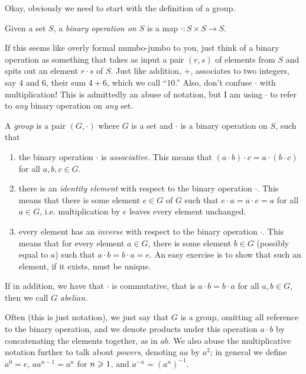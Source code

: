 \documentclass{article}
\begin{document}
Okay, obviously we need to start with the definition of a group.
\begin{definition}
Given a set $S$, a \emph{binary operation on $S$} is a map $\cdot:S\times S\to S$. 
\end{definition}
If this seems like overly formal mumbo-jumbo to you, just think of a binary operation as something that takes as input a pair $(r,s)$ of elements from $S$ and spits out an element $r\cdot s$ of $S$. Just like addition, $+$, associates to two integers, say $4$ and $6$, their sum $4+6$, which we call ``$10$.'' Also, don't confuse $\cdot$ with multiplication! This is admittedly an abuse of notation, but I am using $\cdot$ to refer to \emph{any} binary operation on \emph{any} set.  
\begin{definition}
A \emph{group} is a pair $(G,\cdot)$ where $G$ is a set and $\cdot$ is a binary operation on $S$, such that 
\begin{enumerate}[label=(G\arabic*)]
\item the binary operation $\cdot$ is \emph{associative}. This means that $(a\cdot b)\cdot c = a\cdot (b\cdot c)$ for all $a,b,c\in G$. 
\item there is an \emph{identity element} with respect to the binary operation $\cdot$. This means that there is some element $e\in G$ of $G$ such that $e\cdot a = a\cdot e = a$ for all $a\in G$, i.e. multiplication by $e$ leaves every element unchanged.
\item every element has an \emph{inverse} with respect to the binary operation $\cdot$. This means that for every element $a\in G$, there is some element $b\in G$ (possibly equal to $a$) such that $a\cdot b = b\cdot a = e$. An easy exercise is to show that such an element, if it exists, must be unique.
\end{enumerate}
If in addition, we have that $\cdot$ is commutative, that is $a\cdot b = b\cdot a$ for all $a,b\in G$, then we call $G$ \emph{abelian}.
\end{definition}

Often (this is just notation), we just say that $G$ is a group, omitting all reference to the binary operation, and we denote products under this operation $a\cdot b$ by concatenating the elements together, as in $ab$. We also abuse the multiplicative notation further to talk about \emph{powers}, denoting $aa$ by $a^2$; in general we define $a^0=e$, $aa^{n-1}=a^n$ for $n\geqslant 1$, and $a^{-n}=(a^n)^{-1}$.  
\end{document}
